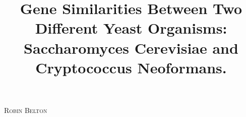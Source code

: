 \documentclass[11pt]{amsart}
\title[Gene Similarities in Yeast Organisms] {Gene Similarities Between Two Different Yeast Organisms: Saccharomyces Cerevisiae and
Cryptococcus Neoformans.}
\author[R. Belton]{}
\begin{document}
\centerline{\scshape Robin Belton}%







\maketitle









\end{document}
